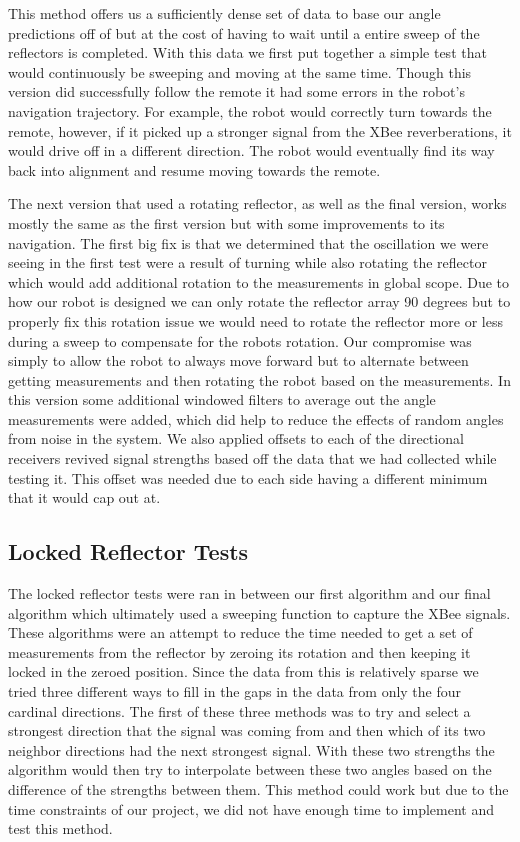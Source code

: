 \vspace*{12pt}
\noindent
This method offers us a sufficiently dense set of data to base our angle predictions off of but at the cost of having to wait until a entire sweep of the reflectors is completed. With this data we first put together a simple test that would continuously be sweeping and moving at the same time. Though this version did successfully follow the remote it had some errors in the robot's navigation trajectory. For example, the robot would correctly turn towards the remote, however, if it picked up a stronger signal from the XBee reverberations, it would drive off in a different direction. The robot would eventually find its way back into alignment and resume moving towards the remote.

\vspace*{12pt}
\noindent
The next version that used a rotating reflector, as well as the final version, works mostly the same as the first version but with some improvements to its navigation. The first big fix is that we determined that the oscillation we were seeing in the first test were a result of turning while also rotating the reflector which would add additional rotation to the measurements in global scope. Due to how our robot is designed we can only rotate the reflector array 90 degrees but to properly fix this rotation issue we would need to rotate the reflector more or less during a sweep to compensate for the robots rotation. Our compromise was simply to allow the robot to always move forward but to alternate between getting measurements and then rotating the robot based on the measurements. In this version some additional windowed filters to average out the angle measurements were added, which did help to reduce the effects of random angles from noise in the system. We also applied offsets to each of the directional receivers revived signal strengths based off the data that we had collected while testing it. This offset was needed due to each side having a different minimum that it would cap out at.

\subsection{Locked Reflector Tests}

The locked reflector tests were ran in between our first algorithm and our final algorithm which ultimately used a sweeping function to capture the XBee signals. These algorithms were an attempt to reduce the time needed to get a set of measurements from the reflector by zeroing its rotation and then keeping it locked in the zeroed position. Since the data from this is relatively sparse we tried three different ways to fill in the gaps in the data from only the four cardinal directions. The first of these three methods was to try and select a strongest direction that the signal was coming from and then which of its two neighbor directions had the next strongest signal. With these two strengths the algorithm would then try to interpolate between these two angles based on the difference of the strengths between them. This method could work but due to the time constraints of our project, we did not have enough time to implement and test this method.

